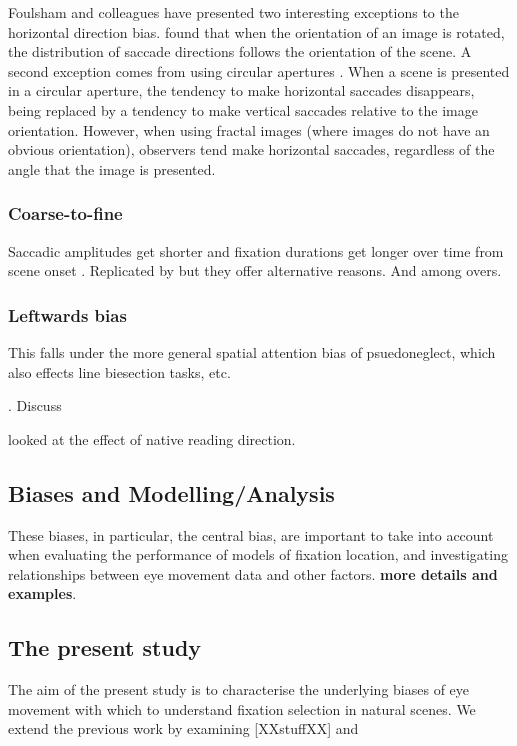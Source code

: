 \documentclass[a4paper, twocolumn, oneside, 10pt]{article}
\begin{document}
Foulsham and colleagues have presented two interesting exceptions to the horizontal direction bias. \cite{Foulsham2008} found that when the orientation of an image is rotated, the distribution of saccade directions follows the orientation of the scene. A second exception comes from using circular apertures \citep{Foulsham-kingstone2010}. When a scene is presented in a circular aperture, the tendency to make horizontal saccades disappears, being replaced by a tendency to make vertical saccades relative to the image orientation. However, when using fractal images (where images do not have an obvious orientation), observers tend make horizontal saccades, regardless of the angle that the image is presented.

\subsubsection{Coarse-to-fine}

Saccadic amplitudes get shorter and fixation durations get longer over time from scene onset \citep{over2007}. Replicated by \cite{godwin2014} but they offer alternative reasons. And \cite{macinnes2014}
among overs. 


\subsubsection{Leftwards bias}

This falls under the more general spatial attention bias of psuedoneglect, which also effects line biesection tasks, etc.

\citep{ossandon2014,nuthmann-matthias2014,learmonth2015}. Discuss 

\cite{friedrich2014} looked at the effect of native reading direction. 

\subsection{Biases and Modelling/Analysis}

These biases, in particular, the central bias, are important to take into account when evaluating the performance of models of fixation location, and investigating relationships between eye movement data and other factors. \textbf{more details and examples}. 

\subsection{The present study}
The aim of the present study is to characterise the underlying biases of eye movement with which to understand fixation selection in natural scenes. We extend the previous work by examining [XXstuffXX] and 
\end{document}
